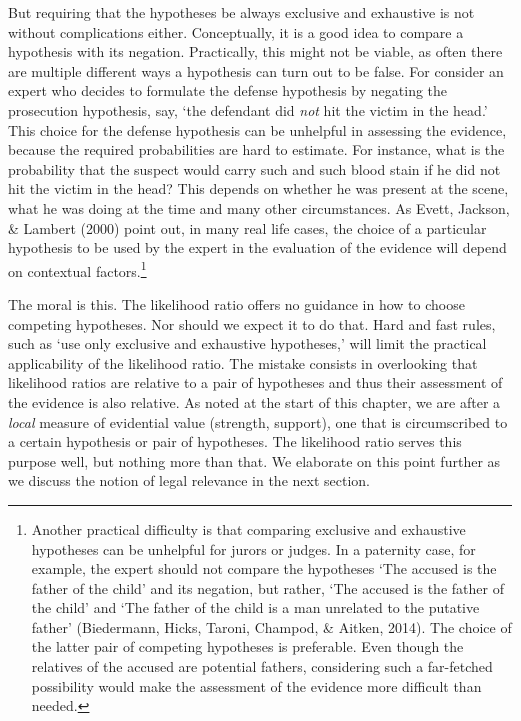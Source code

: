 \documentclass[
  10pt,
  dvipsnames,enabledeprecatedfontcommands]{scrartcl}
\begin{document}
But requiring that the hypotheses be always exclusive and exhaustive is
not without complications either. Conceptually, it is a good idea to
compare a hypothesis with its negation. Practically, this might not be
viable, as often there are multiple different ways a hypothesis can turn
out to be false. For consider an expert who decides to formulate the
defense hypothesis by negating the prosecution hypothesis, say, `the
defendant did \textit{not} hit the victim in the head.' This choice for
the defense hypothesis can be unhelpful in assessing the evidence,
because the required probabilities are hard to estimate. For instance,
what is the probability that the suspect would carry such and such blood
stain if he did not hit the victim in the head? This depends on whether
he was present at the scene, what he was doing at the time and many
other circumstances. As Evett, Jackson, \& Lambert (2000) point out, in
many real life cases, the choice of a particular hypothesis to be used
by the expert in the evaluation of the evidence will depend on
contextual factors.\footnote{Another practical difficulty is that
  comparing exclusive and exhaustive hypotheses can be unhelpful for
  jurors or judges. In a paternity case, for example, the expert should
  not compare the hypotheses `The accused is the father of the child'
  and its negation, but rather, `The accused is the father of the child'
  and `The father of the child is a man unrelated to the putative
  father' (Biedermann, Hicks, Taroni, Champod, \& Aitken, 2014). The
  choice of the latter pair of competing hypotheses is preferable. Even
  though the relatives of the accused are potential fathers, considering
  such a far-fetched possibility would make the assessment of the
  evidence more difficult than needed.}

The moral is this. The likelihood ratio offers no guidance in how to
choose competing hypotheses. Nor should we expect it to do that. Hard
and fast rules, such as `use only exclusive and exhaustive hypotheses,'
will limit the practical applicability of the likelihood ratio. The
mistake consists in overlooking that likelihood ratios are relative to a
pair of hypotheses and thus their assessment of the evidence is also
relative. As noted at the start of this chapter, we are after a
\textit{local} measure of evidential value (strength, support), one that
is circumscribed to a certain hypothesis or pair of hypotheses. The
likelihood ratio serves this purpose well, but nothing more than that.
We elaborate on this point further as we discuss the notion of legal
relevance in the next section.
\end{document}
